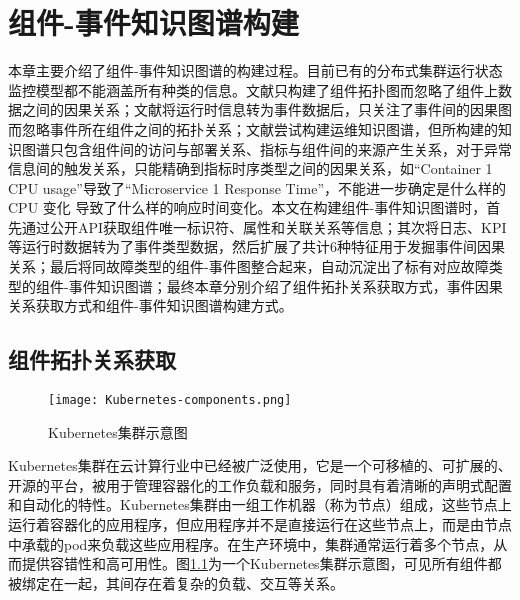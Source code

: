 \chapter{组件-事件知识图谱构建}
本章主要介绍了组件-事件知识图谱的构建过程。目前已有的分布式集群运行状态监控模型都不能涵盖所有种类的信息。文献\parencite{wang2019grano}只构建了组件拓扑图而忽略了组件上数据之间的因果关系；文献\parencite{nie2016mining-causality-graph}将运行时信息转为事件数据后，只关注了事件间的因果图而忽略事件所在组件之间的拓扑关系；文献\parencite{qiu2020causality-mining-knowledge-graph}尝试构建运维知识图谱，但所构建的知识图谱只包含组件间的访问与部署关系、指标与组件间的来源产生关系，对于异常信息间的触发关系，只能精确到指标时序类型之间的因果关系，如“Container
1 CPU usage”导致了“Microservice 1 Response Time”，不能进一步确定是什么样的 CPU 变化
导致了什么样的响应时间变化。本文在构建组件-事件知识图谱时，首先通过公开API获取组件唯一标识符、属性和关联关系等信息；其次将日志、KPI等运行时数据转为了事件类型数据，然后扩展了共计6种特征用于发掘事件间因果关系；最后将同故障类型的组件-事件图整合起来，自动沉淀出了标有对应故障类型的组件-事件知识图谱；最终本章分别介绍了组件拓扑关系获取方式，事件因果关系获取方式和组件-事件知识图谱构建方式。

\section{组件拓扑关系获取}
\begin{figure}[htbp]
    \centering
    \texttt{[image: Kubernetes-components.png]}
    \caption{Kubernetes集群示意图\label{Kubernetes-components}}
\end{figure}
Kubernetes集群\cite{bernstein2014containers}在云计算行业中已经被广泛使用，它是一个可移植的、可扩展的、开源的平台，被用于管理容器化的工作负载和服务，同时具有着清晰的声明式配置和自动化的特性。Kubernetes集群由一组工作机器（称为节点）组成，这些节点上运行着容器化的应用程序，但应用程序并不是直接运行在这些节点上，而是由节点中承载的pod来负载这些应用程序。在生产环境中，集群通常运行着多个节点，从而提供容错性和高可用性。图\ref{Kubernetes-components}为一个Kubernetes集群示意图，可见所有组件都被绑定在一起，其间存在着复杂的负载、交互等关系。

